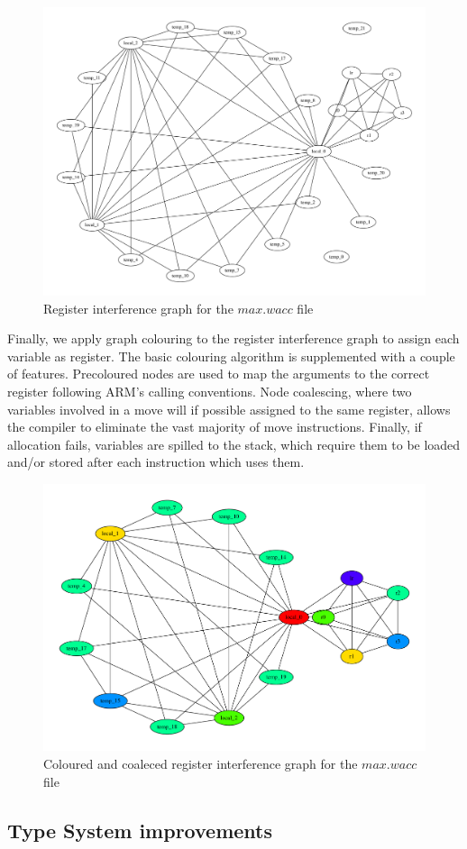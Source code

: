\documentclass{article}
\begin{document}
\begin{figure}
  \centering
  \includegraphics[width=.7\textwidth]{max-rig.pdf}
  \caption{Register interference graph for the $max.wacc$ file}
\end{figure}

Finally, we apply graph colouring to the register interference graph to assign each variable as register. The basic colouring algorithm
is supplemented with a couple of features. Precoloured nodes are used to map the arguments to the correct register following ARM's calling
conventions. Node coalescing, where two variables involved in a move will if possible assigned to the same register, allows the compiler
to eliminate the vast majority of move instructions. Finally, if allocation fails, variables are spilled to the stack, which require them
to be loaded and/or stored after each instruction which uses them.

\begin{figure}
  \centering
  \includegraphics[width=.7\textwidth]{max-colouring.pdf}
  \caption{Coloured and coaleced register interference graph for the $max.wacc$ file}
\end{figure}

\subsection{Type System improvements}
\end{document}
